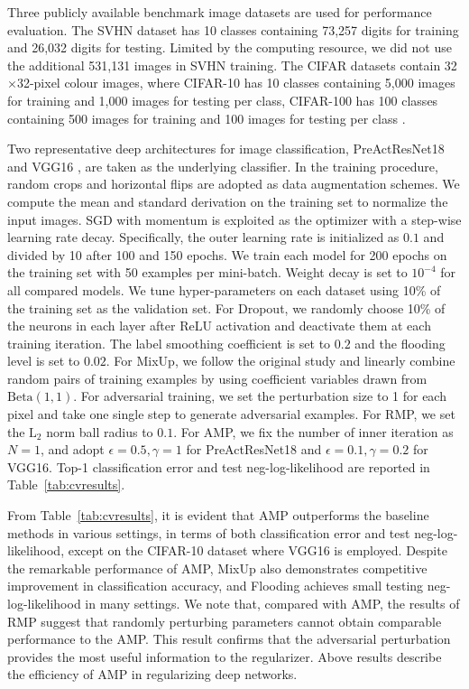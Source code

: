 \documentclass[final]{cvpr}
\begin{document}
Three publicly available benchmark image datasets are used for performance evaluation. The SVHN dataset \cite{netzer2011reading} has 10 classes containing 73,257 digits for training and 26,032 digits for testing. Limited by the computing resource, we did not use the additional 531,131 images in SVHN training. The CIFAR datasets contain 32$\times$32-pixel colour images, where CIFAR-10 has 10 classes containing 5,000 images for training and 1,000 images for testing per class, CIFAR-100 has 100 classes containing 500 images for training and 100 images for testing per class \cite{krizhevsky2009learning}. 

Two representative deep architectures for image classification, PreActResNet18 \cite{he2016identity} and VGG16 \cite{simonyan2015very}, are taken as the underlying classifier. In the training procedure, random crops and horizontal flips are adopted as data augmentation schemes. We compute the mean and standard derivation on the training set to normalize the input images. SGD with momentum is exploited as the optimizer with a step-wise learning rate decay. Specifically, the outer learning rate is initialized as $0.1$ and divided by 10 after 100 and 150 epochs. We train each model for 200 epochs on the training set with 50 examples per mini-batch. Weight decay is set to $10^{-4}$ for all compared models. We tune hyper-parameters on each dataset using 10\% of the training set as the validation set. For Dropout, we randomly choose 10\% of the neurons in each layer after ReLU activation and deactivate them at each training iteration. The label smoothing coefficient is set to $0.2$ and the flooding level is set to $0.02$. For MixUp, we follow the original study \cite{zhang2018mixup} and linearly combine random pairs of training examples by using coefficient variables drawn from $\text{Beta}(1,1)$. For adversarial training, we set the perturbation size to 1 for each pixel and take one single step to generate adversarial examples. For RMP, we set the $\text{L}_2$ norm ball radius to $0.1$. For AMP, we fix the number of inner iteration as $N=1$, and adopt $\epsilon=0.5,\gamma=1$ for PreActResNet18 and $\epsilon=0.1,\gamma=0.2$ for VGG16. Top-1 classification error and test neg-log-likelihood are reported in Table~\ref{tab:cvresults}.

From Table~\ref{tab:cvresults}, it is evident that AMP outperforms the baseline methods in various settings, in terms of both classification error and test neg-log-likelihood, except on the CIFAR-10 dataset where VGG16 is employed. Despite the remarkable performance of AMP, MixUp also demonstrates competitive improvement in classification accuracy, and Flooding achieves small testing neg-log-likelihood in many settings. We note that, compared with AMP, the results of RMP suggest that randomly perturbing parameters cannot obtain comparable performance to the AMP. This result confirms that the adversarial perturbation provides the most useful information to the regularizer. Above results describe the efficiency of AMP in regularizing deep networks.
\end{document}
